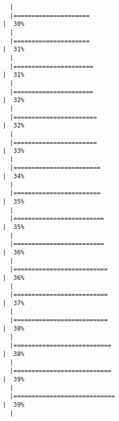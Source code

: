 \documentclass[
  letterpaper,
]{book}
\begin{document}
\begin{verbatim}
  |                                                                            
  |=====================                                                 |  30%
  |                                                                            
  |=====================                                                 |  31%
  |                                                                            
  |======================                                                |  31%
  |                                                                            
  |======================                                                |  32%
  |                                                                            
  |=======================                                               |  32%
  |                                                                            
  |=======================                                               |  33%
  |                                                                            
  |========================                                              |  34%
  |                                                                            
  |========================                                              |  35%
  |                                                                            
  |=========================                                             |  35%
  |                                                                            
  |=========================                                             |  36%
  |                                                                            
  |==========================                                            |  36%
  |                                                                            
  |==========================                                            |  37%
  |                                                                            
  |==========================                                            |  38%
  |                                                                            
  |===========================                                           |  38%
  |                                                                            
  |===========================                                           |  39%
  |                                                                            
  |============================                                          |  39%
  |                                                                            

\end{verbatim}
\end{document}
